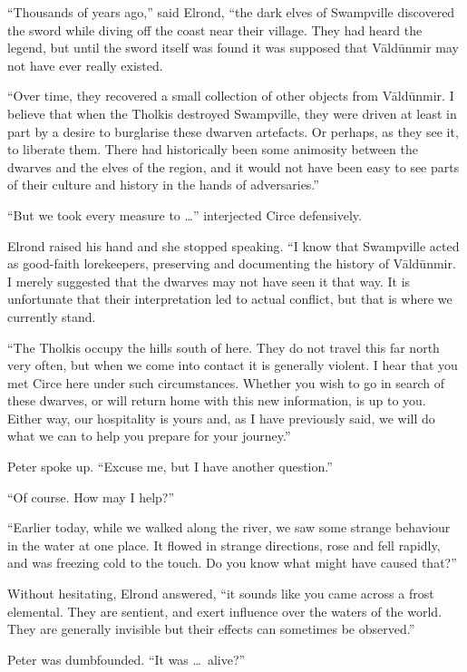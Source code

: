 ``Thousands of years ago,'' said Elrond, ``the dark elves of Swampville discovered the sword while diving off the coast near their village.  They had heard the legend, but until the sword itself was found it was supposed that V\=ald\=unmir may not have ever really existed.

``Over time, they recovered a small collection of other objects from V\=ald\=unmir.  I believe that when the Tholkis destroyed Swampville, they were driven at least in part by a desire to burglarise these dwarven artefacts.  Or perhaps, as they see it, to liberate them.  There had historically been some animosity between the dwarves and the elves of the region, and it would not have been easy to see parts of their culture and history in the hands of adversaries.''

``But we took every measure to \ldots'' interjected Circe defensively.

Elrond raised his hand and she stopped speaking.  ``I know that Swampville acted as good-faith lorekeepers, preserving and documenting the history of V\=ald\=unmir.  I merely suggested that the dwarves may not have seen it that way.  It is unfortunate that their interpretation led to actual conflict, but that is where we currently stand.

``The Tholkis occupy the hills south of here.  They do not travel this far north very often, but when we come into contact it is generally violent.  I hear that you met Circe here under such circumstances.  Whether you wish to go in search of these dwarves, or will return home with this new information, is up to you.  Either way, our hospitality is yours and, as I have previously said, we will do what we can to help you prepare for your journey.''

Peter spoke up.  ``Excuse me, but I have another question.''

``Of course.  How may I help?''

``Earlier today, while we walked along the river, we saw some strange behaviour in the water at one place.  It flowed in strange directions, rose and fell rapidly, and was freezing cold to the touch.  Do you know what might have caused that?''

Without hesitating, Elrond answered, ``it sounds like you came across a frost elemental.  They are sentient, and exert influence over the waters of the world.  They are generally invisible but their effects can sometimes be observed.''

Peter was dumbfounded.  ``It was \ldots\ alive?''

